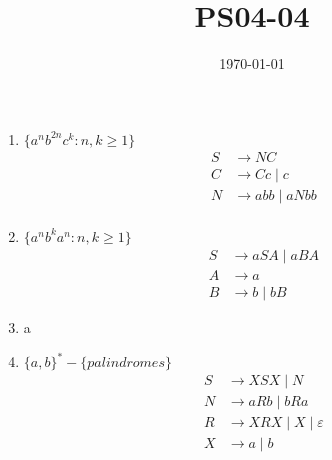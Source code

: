 \documentclass{article}
\title{PS04-04}
\date{\today}
\begin{document}
\maketitle

\begin{enumerate}[label=\alph*.]
	\item $\{a^nb^{2n}c^k : n,k \geq 1\}$
	\begin{align*}
	S &\rightarrow NC\\
	C &\rightarrow Cc \mid c\\
	N &\rightarrow abb \mid aNbb\\
	\end{align*}
	\item $\{a^nb^ka^n : n,k \geq 1\}$
	\begin{align*}
	S &\rightarrow aSA \mid aBA\\
	A &\rightarrow a\\
	B &\rightarrow b \mid bB
	\end{align*}
	\item a%
	\item $\{a,b\}^*-\{palindromes\}$
	\begin{align*}
	S &\rightarrow XSX \mid N\\
	N &\rightarrow aRb \mid bRa\\
	R &\rightarrow XRX \mid X \mid \varepsilon\\
	X &\rightarrow a\mid b
	\end{align*}

\end{enumerate}
\end{document}
